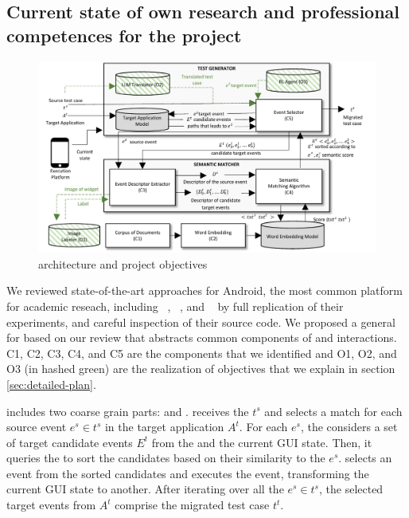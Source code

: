 	
\subsection{Current state of own research and professional competences for the project}
\label{sec:own-research}

\begin{figure}[h]
	\centering
	\includegraphics[width=\textwidth]{images/architecture.pdf}
	\caption{\testreuse architecture and project objectives}
	\label{fig:architecture}
\end{figure}

We reviewed state-of-the-art \testreuse approaches for Android, the most common platform for academic reseach, including \atm~\cite{behrang:apptestmigrator:ASE:2019}, \craftdroid~\cite{lin:craftdroid:ASE:2019}, and \adaptdroid~\cite{Mariani:Adaptdroid:AST:2021} by full replication of their experiments, and careful inspection of their source code.
We proposed a general \architecture for \testreuse based on our review that abstracts common components of \testreuse  and interactions. 
C1, C2, C3, C4, and C5 are the components that we identified and O1, O2, and O3 (in hashed green) are the realization of \project objectives that we explain in section \ref{sec:detailed-plan}. 


\smallskip 
\testreuse  includes two coarse grain parts: \generator and \matcher.
\generator receives the $t^s$ and selects a match for each source event $e^s \in t^s$ in the target application $A^t$.
For each $e^s$, the \generator considers a set of target candidate events $E^t$ from the \tam and the current GUI state. 
Then, it queries the \matcher to sort the candidates based on their similarity to the $e^s$.
\generator selects an event from the sorted candidates and executes the event, transforming the current GUI state to another. 
After iterating over all the $e^s \in t^s$, the selected target events from $A^t$ comprise the migrated test case $t^t$. 



